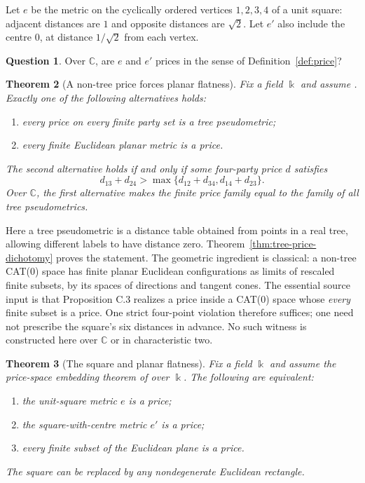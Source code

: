 \documentclass[11pt,a4paper]{article}
\newcommand{\C}{\mathbb C}
\newcommand{\kk}{\Bbbk}
\newtheorem{theorem}{Theorem}[section]
\theoremstyle{definition}
\newtheorem{question}[theorem]{Question}
\theoremstyle{remark}
\begin{document}
Let $e$ be the metric on the cyclically ordered vertices $1,2,3,4$ of
a unit square: adjacent distances are $1$ and opposite distances are
$\sqrt2$. Let $e'$ also include the centre $0$, at distance $1/\sqrt2$
from each vertex.

\begin{question}\label{q:square}
Over $\C$, are $e$ and $e'$ prices in the sense of
Definition~\ref{def:price}?
\end{question}

\begin{theorem}[A non-tree price forces planar flatness]
\label{thm:intro-tree-alternative}
Fix a field $\kk$ and assume
\cite[Proposition C.3, p.~28]{Anthropic2026}.
Exactly one of the following alternatives holds:
\begin{enumerate}
\item every price on every finite party set is a tree pseudometric;
\item every finite Euclidean planar metric is a price.
\end{enumerate}
The second alternative holds if and only if some four-party price
$d$ satisfies
\[
d_{13}+d_{24}>
\max\{d_{12}+d_{34},d_{14}+d_{23}\}.
\]
Over $\C$, the first alternative makes the finite price family
equal to the family of all tree pseudometrics.
\end{theorem}

Here a tree pseudometric is a distance table obtained from points
in a real tree, allowing different labels to have distance zero.
Theorem~\ref{thm:tree-price-dichotomy} proves the statement.
The geometric ingredient is classical: a non-tree CAT(0) space
has finite planar Euclidean configurations as limits of rescaled
finite subsets, by its spaces of directions and tangent cones.
The essential source input is that Proposition C.3 realizes a
price inside a CAT(0) space whose \emph{every} finite subset is
a price. One strict four-point violation therefore suffices;
one need not prescribe the square's six distances in advance.
No such witness is constructed here over $\C$ or in
characteristic two.

\begin{theorem}[The square and planar flatness]\label{thm:introplanar}
Fix a field $\kk$ and assume the price-space embedding theorem of
\cite[Proposition C.3, p.~28]{Anthropic2026} over $\kk$.
The following are equivalent:
\begin{enumerate}
\item the unit-square metric $e$ is a price;
\item the square-with-centre metric $e'$ is a price;
\item every finite subset of the Euclidean plane is a price.
\end{enumerate}
The square can be replaced by any nondegenerate Euclidean rectangle.
\end{theorem}
\end{document}

